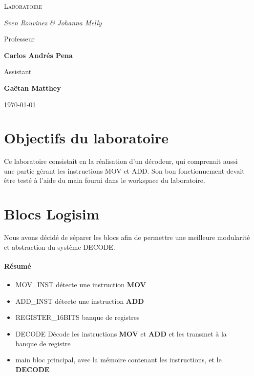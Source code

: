 \documentclass[a4paper]{article} %
\begin{document}
\renewcommand{\labelitemi}{$\bullet$}
\renewcommand{\labelitemii}{$\cdot$}
\renewcommand{\labelitemiii}{$\diamond$}
\renewcommand{\labelitemiv}{$\ast$}

\begin{titlepage}
	\centering
	
	{\scshape\LARGE \color{Monokaimagenta} Laboratoire \\  \par}
	
	\vspace{1cm}
	
	{\Large\itshape Sven Rouvinez \& Johanna Melly\par}
	
	\vfill
	Professeur\par
	\textbf{Carlos Andrés Pena} \par%
	\vspace{1cm}
	Assistant\par
	\textbf{Gaëtan Matthey}
	
	\vfill

	{\large \today\par}
	
\end{titlepage}

\section{Objectifs du laboratoire}
Ce laboratoire consistait en la réalisation d'un décodeur, qui comprenait aussi une partie gérant les instructions MOV et ADD. Son bon fonctionnement devait être testé à l'aide du main fourni dans le workspace du laboratoire.

\section{Blocs Logisim}
Nous avons décidé de séparer les blocs afin de permettre une meilleure modularité et abstraction du système DECODE.\\
\paragraph{Résumé}
\begin{itemize}
    \item     MOV\_INST détecte une instruction \textbf{MOV}
    \item     ADD\_INST détecte une instruction \textbf{ADD}
    \item     REGISTER\_16BITS banque de registres
    \item     DECODE Décode les instructions \textbf{MOV} et \textbf{ADD} et les transmet à la banque de registre
    \item     main bloc principal, avec la mémoire contenant les instructions, et le \textbf{DECODE}
\end{itemize}
\end{document}
